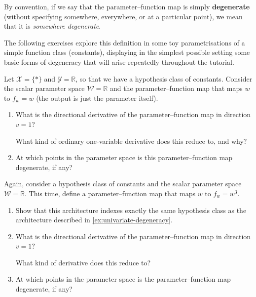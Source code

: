 \documentclass[11pt]{article}
\newcommand{\R}{\mathbb{R}}
\newcommand{\X}{\mathcal{X}}
\newcommand{\Y}{\mathcal{Y}}
\newcommand{\W}{\mathcal{W}}
\begin{document}
By convention, if we say that the parameter--function map is simply
\textbf{degenerate} (without specifying somewhere, everywhere, or at a
particular point), we mean that it is \emph{somewhere degenerate}.

The following exercises explore this definition in some toy parametrisations of a simple function class (constants), displaying in the simplest possible setting some basic forms of degeneracy that will arise repeatedly throughout the tutorial.

\begin{exercise}
\label{ex:univariate-degeneracy}
Let $\X = \{\ast\}$ and $\Y = \R$, so that we have a hypothesis class of constants. Consider the scalar parameter space $\W = \R$ and the parameter--function map that maps $w$ to $f_w = w$ (the output is just the parameter itself).
\begin{enumerate}
    \item What is the directional derivative of the parameter--function map in
        direction $v = 1$?
    \begin{hint}
What kind of ordinary one-variable derivative does this reduce to, and why?
    \end{hint}
    \item At which points in the parameter space is this parameter--function map degenerate, if any?
\end{enumerate}
\end{exercise}

\begin{exercise}
\label{ex:cubic-degeneracy}
Again, consider a hypothesis class of constants and the scalar parameter space $\W = \R$. This time, define a parameter--function map that maps $w$ to $f_w = w^3$.
\begin{enumerate}
    \item Show that this architecture indexes exactly the same hypothesis class as the architecture described in \cref{ex:univariate-degeneracy}.
    \item What is the directional derivative of the parameter--function map in
        direction $v = 1$?
    \begin{hint}
What kind of derivative does this reduce to?
    \end{hint}
    \item At which points in the parameter space is the parameter--function map degenerate, if any?
\end{enumerate}
\end{exercise}
\end{document}
